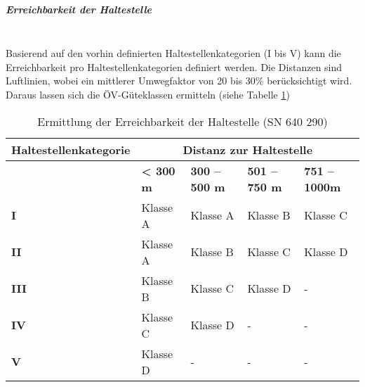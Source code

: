 \subparagraph{Erreichbarkeit der Haltestelle}~\\
\label{Definition ÖV-Güteklassen:Erreichbarkeit der Haltestelle}
Basierend auf den vorhin definierten Haltestellenkategorien (I bis V) kann die Erreichbarkeit pro Haltestellenkategorien definiert werden.
Die Distanzen sind Luftlinien, wobei ein mittlerer Umwegfaktor von 20 bis 30\% berücksichtigt wird.
Daraus lassen sich die \gls{ÖV-Güteklassen} ermitteln (siehe Tabelle \ref{table:Ermittlung Erreichbarkeit der Haltestelle (SN 640 290)})

\begin{table}[ht]
    \begin{tabular}[c]{l p{2.5cm} p{2.5cm} p{2.5cm} p{2.5cm}}
        \toprule
        \textbf{Haltestellenkategorie}
                                & \multicolumn{4}{c}{\textbf{Distanz zur \gls{Haltestelle}}}\\
        \midrule
        \textbf{}
                                & \textbf{< 300 m}
                                & \textbf{300 -- 500 m}
                                & \textbf{501 -- 750 m}
                                & \textbf{751 -- 1000m}\\
        \textbf{I}
                                & Klasse A
                                & Klasse A
                                & Klasse B
                                & Klasse C\\
        \textbf{II}
                                & Klasse A
                                & Klasse B
                                & Klasse C
                                & Klasse D\\
        \textbf{III}
                                & Klasse B
                                & Klasse C
                                & Klasse D
                                & -\\
        \textbf{IV}
                                & Klasse C
                                & Klasse D
                                & -
                                & -\\
        \textbf{V}
                                & Klasse D
                                & -
                                & -
                                & -\\
        \bottomrule
    \end{tabular}
    \caption{Ermittlung der Erreichbarkeit der Haltestelle (SN 640 290)}
    \label{table:Ermittlung Erreichbarkeit der Haltestelle (SN 640 290)}
\end{table}

